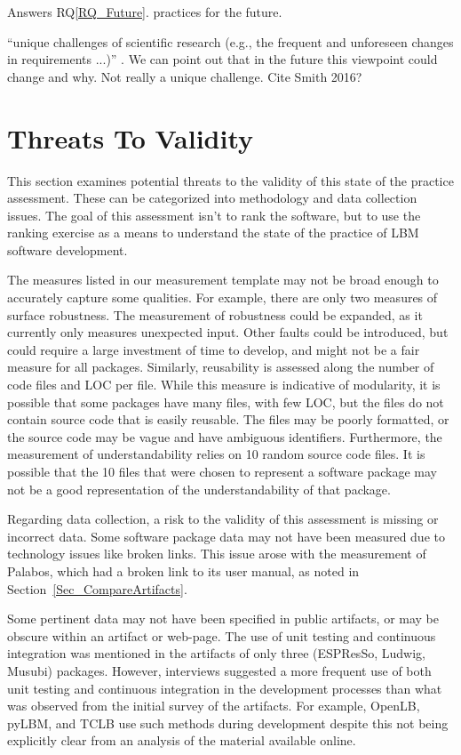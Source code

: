 \documentclass[final, 3p, times, authoryear]{elsarticle}
\newcommand{\rqref}[1]{RQ\ref{#1}}
\begin{document}
Answers \rqref{RQ_Future}.  practices for the future.

``unique challenges of scientific research (e.g., the frequent and unforeseen
changes in requirements ...)'' \citep{PintoEtAl2018}. We can point out that in
the future this viewpoint could change and why.  Not really a unique challenge.
Cite Smith 2016?

\section{Threats To Validity} \label{threats}

This section examines potential threats to the validity of this state of the
practice assessment. These can be categorized into methodology and data
collection issues. The goal of this assessment isn't to rank the software, but
to use the ranking exercise as a means to understand the state of the practice
of LBM software development.

The measures listed in our measurement template may not be broad enough to
accurately capture some qualities. For example, there are only two measures of
surface robustness. The measurement of robustness could be expanded, as it
currently only measures unexpected input. Other faults could be introduced, but
could require a large investment of time to develop, and might not be a fair
measure for all packages. Similarly, reusability is assessed along the number of
code files and LOC per file. While this measure is indicative of modularity, it
is possible that some packages have many files, with few LOC, but the files do
not contain source code that is easily reusable. The files may be poorly
formatted, or the source code may be vague and have ambiguous identifiers.
Furthermore, the measurement of understandability relies on 10 random source
code files. It is possible that the 10 files that were chosen to represent a
software package may not be a good representation of the understandability of
that package.

Regarding data collection, a risk to the validity of this assessment is missing
or incorrect data. Some software package data may not have been measured due to
technology issues like broken links. This issue arose with the measurement of
Palabos, which had a broken link to its user manual, as noted in
Section~\ref{Sec_CompareArtifacts}. 

Some pertinent data may not have been specified in public artifacts, or may be
obscure within an artifact or web-page. The use of unit testing and continuous
integration was mentioned in the artifacts of only three (ESPResSo, Ludwig,
Musubi) packages. However, interviews suggested a more frequent use of both unit
testing and continuous integration in the development processes than what was
observed from the initial survey of the artifacts. For example, OpenLB, pyLBM,
and TCLB use such methods during development despite this not being explicitly
clear from an analysis of the material available online. 
\end{document}
